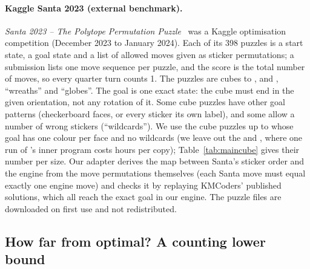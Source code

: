 \paragraph{Kaggle Santa 2023 (external benchmark).}
\emph{Santa 2023 -- The Polytope Permutation Puzzle}~\cite{kaggle2023santa} was a Kaggle optimisation competition
(December 2023 to January 2024). Each of its 398 puzzles is a start state, a goal state and a list of allowed moves
given as sticker permutations; a submission lists one move sequence per puzzle, and the score is the total number of
moves, so every quarter turn counts 1. The puzzles are cubes  to ,  and , ``wreaths'' and
``globes''. The goal is one exact state: the cube must end in the given orientation, not any rotation of it. Some
cube puzzles have other goal patterns (checkerboard faces, or every sticker its own label), and some allow a number of
wrong stickers (``wildcards''). We use the \SantaTotal{} cube puzzles up to  whose goal has one colour per face and no
wildcards (we leave out the  and , where one run of \Mseven's inner program costs hours per copy); Table~\ref{tab:maincube} gives their number per size. Our adapter derives the map between Santa's sticker
order and the engine from the move permutations themselves (each Santa move must equal exactly one engine move) and
checks it by replaying KMCoders' published solutions, which all reach the exact goal in our engine. The puzzle files
are downloaded on first use and not redistributed.

\subsection{How far from optimal? A counting lower bound}
\label{sec:bound}

